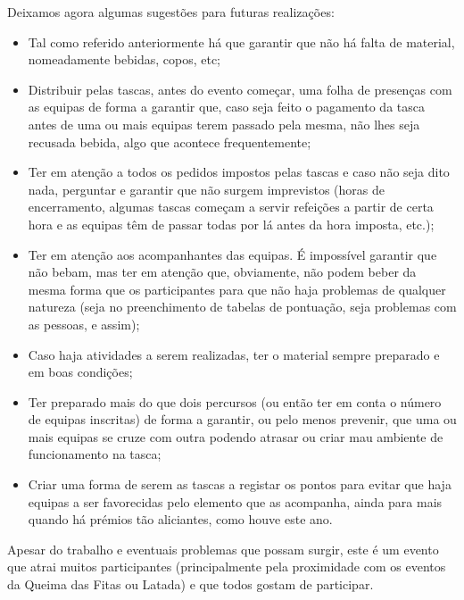 Deixamos agora algumas sugestões para futuras realizações:
\begin{itemize}
    \item Tal como referido anteriormente há que garantir que não há falta de material, nomeadamente bebidas, copos, etc;
    \item Distribuir pelas tascas, antes do evento começar, uma folha de presenças com as equipas de forma a garantir que, caso seja feito o pagamento da tasca antes de uma ou mais equipas terem passado pela mesma, não lhes seja recusada bebida, algo que acontece frequentemente; 
    \item Ter em atenção a todos os pedidos impostos pelas tascas e caso não seja dito nada, perguntar e garantir que não surgem imprevistos (horas de encerramento, algumas tascas começam a servir refeições a partir de certa hora e as equipas têm de passar todas por lá antes da hora imposta, etc.);
    \item Ter em atenção aos acompanhantes das equipas. É impossível garantir que não bebam, mas ter em atenção que, obviamente, não podem beber da mesma forma que os participantes para que não haja problemas de qualquer natureza (seja no preenchimento de tabelas de pontuação, seja problemas com as pessoas, e assim);
    \item Caso haja atividades a serem realizadas, ter o material sempre preparado e em boas condições;
    \item Ter preparado mais do que dois percursos (ou então ter em conta o número de equipas inscritas) de forma a garantir, ou pelo menos prevenir, que uma ou mais equipas se cruze com outra podendo atrasar ou criar mau ambiente de funcionamento na tasca;
    \item Criar uma forma de serem as tascas a registar os pontos para evitar que haja equipas a ser favorecidas pelo elemento que as acompanha, ainda para mais quando há prémios tão aliciantes, como houve este ano.
\end{itemize}

Apesar do trabalho e eventuais problemas que possam surgir, este é um evento que atrai muitos participantes (principalmente pela proximidade com os eventos da Queima das Fitas ou Latada) e que todos gostam de participar.